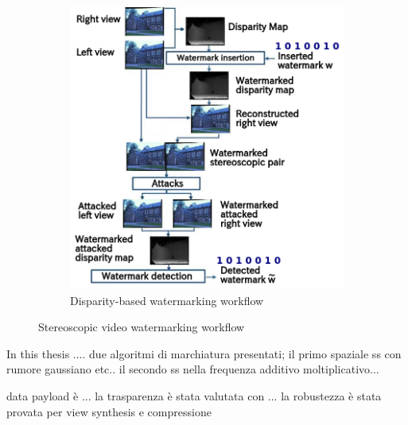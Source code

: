 \begin{figure}[h!]
\begin{subfigure}[]{0.4\textwidth}
\includegraphics[width=1.05\textwidth]{./img/disparity_domain.png}
\caption{\small{Disparity-based watermarking workflow}}
\label{fig:disp}
\end{subfigure}
\caption{\small{Stereoscopic video watermarking workflow}\label{stereo_method}}
\end{figure}


\newpage
In this thesis ....
due algoritmi di marchiatura presentati; il primo spaziale ss con rumore gaussiano etc.. 
il secondo ss nella frequenza additivo moltiplicativo...


data payload è ...
la trasparenza è stata valutata con ...
la robustezza è stata provata per view synthesis e compressione



